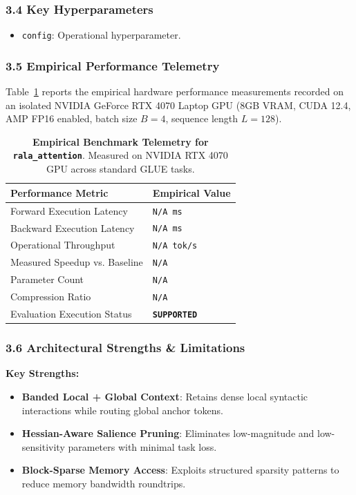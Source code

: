 \subsubsection*{3.4 Key Hyperparameters}
\begin{itemize}
    \item \texttt{config}: Operational hyperparameter.
\end{itemize}

\subsubsection*{3.5 Empirical Performance Telemetry}
Table~\ref{tab:telemetry_rala_attention} reports the empirical hardware performance measurements recorded on an isolated NVIDIA GeForce RTX 4070 Laptop GPU (8GB VRAM, CUDA 12.4, AMP FP16 enabled, batch size $B=4$, sequence length $L=128$).

\begin{table}[h]
\centering
\small
\caption{\textbf{Empirical Benchmark Telemetry for \texttt{rala\_attention}}. Measured on NVIDIA RTX 4070 GPU across standard GLUE tasks.}
\label{tab:telemetry_rala_attention}
\begin{tabularx}{\columnwidth}{lX}
\toprule
\textbf{Performance Metric} & \textbf{Empirical Value} \\
\midrule
Forward Execution Latency & \texttt{N/A ms} \\
Backward Execution Latency & \texttt{N/A ms} \\
Operational Throughput & \texttt{N/A tok/s} \\
Measured Speedup vs. Baseline & \texttt{N/A} \\
Parameter Count & \texttt{N/A} \\
Compression Ratio & \texttt{N/A} \\
Evaluation Execution Status & \textbf{\texttt{SUPPORTED}} \\
\bottomrule
\end{tabularx}
\end{table}

\subsubsection*{3.6 Architectural Strengths \& Limitations}
\textbf{Key Strengths:}
\begin{itemize}
    \item \textbf{Banded Local + Global Context}: Retains dense local syntactic interactions while routing global anchor tokens.
    \item \textbf{Hessian-Aware Salience Pruning}: Eliminates low-magnitude and low-sensitivity parameters with minimal task loss.
    \item \textbf{Block-Sparse Memory Access}: Exploits structured sparsity patterns to reduce memory bandwidth roundtrips.
\end{itemize}


